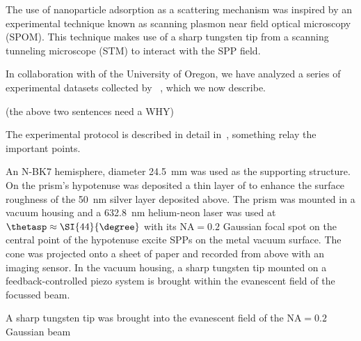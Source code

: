 The use of nanoparticle adsorption as a scattering mechanism was inspired
by an experimental technique known as scanning plasmon near field optical
microscopy (SPOM).  This technique makes use of a sharp tungsten tip from a
scanning tunneling microscope (STM) to interact with the SPP field.  

In collaboration with  of the University of Oregon,
we have analyzed a series of experimental datasets collected by
~\cite{schumann2009surface}, which we now describe.

(the above two sentences need a WHY)

The experimental protocol is described in detail
in~\cite{schumann2009surface}, something relay the important points.

An N-BK7 hemisphere, diameter \SI{24.5}{\milli\meter} was used as the
supporting structure.  On the prism's hypotenuse was deposited a thin layer
of  to enhance the surface roughness of the \SI{50}{\nano\meter}
silver layer deposited above.  The prism was mounted in a vacuum housing
and a \SI{632.8}{\nano\meter} helium-neon laser was used at
$\thetasp\approx\SI{44}{\degree}$ with its $\mathrm{NA}=0.2$ Gaussian focal
spot on the central point of the hypotenuse excite SPPs on the metal vacuum
surface.  The cone was projected onto a sheet of paper and recorded from
above with an imaging sensor.  In the vacuum housing, a sharp tungsten tip
mounted on a feedback-controlled piezo system is brought within the
evanescent field of the focussed beam.

A sharp tungsten tip was brought into the evanescent field of the
$\mathrm{NA}=0.2$ Gaussian beam

